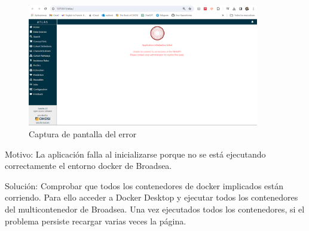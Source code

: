 \begin{figure}[H]
    \centering
    \includegraphics[width=0.90\textwidth]{figures/Error02AppFailed.png}
     \caption{Captura de pantalla del error}
    \label{fig:Error02AppFailed}
\end{figure}

Motivo: La aplicación falla al inicializarse porque no se está ejecutando correctamente el entorno docker de Broadsea.

Solución: Comprobar que todos los contenedores de docker implicados están corriendo. Para ello acceder a Docker Desktop y ejecutar todos los contenedores del multicontenedor de Broadsea. Una vez ejecutados todos los contenedores, si el problema persiste recargar varias veces la página.


